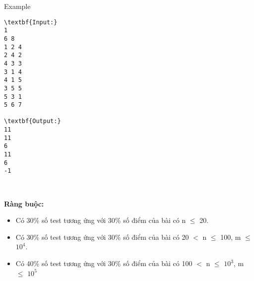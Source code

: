 Example
\begin{verbatim}
\textbf{Input:}
1
6 8
1 2 4
2 4 2
4 3 3
3 1 4
4 1 5
3 5 5
5 3 1
5 6 7

\textbf{Output:}
11
11
6
11
6
-1\end{verbatim}

 

\textbf{Ràng buộc:}
\begin{itemize}
	\item Có 30\% số test tương ứng với 30\% số điểm của bài có n  $\le$  20.
	\item Có 30\% số test tương ứng với 30\% số điểm của bài có 20 $<$ n  $\le$  100, m  $\le$  $10^{4}$.
	\item Có 40\% số test tương ứng với 30\% số điểm của bài có 100 $<$ n  $\le$  $10^{3}$, m  $\le$  $10^{5}$
\end{itemize}
\begin{itemize}
\end{itemize}